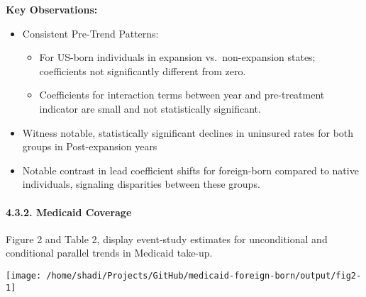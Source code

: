 \documentclass[
]{article}
\providecommand{\tightlist}{%
  \setlength{\itemsep}{0pt}\setlength{\parskip}{0pt}}
\begin{document}
\textbf{Key Observations:}

\begin{itemize}
\item
  Consistent Pre-Trend Patterns:

  \begin{itemize}
  \tightlist
  \item
    For US-born individuals in expansion vs.~non-expansion states;
    coefficients not significantly different from zero.
  \item
    Coefficients for interaction terms between year and pre-treatment
    indicator are small and not statistically significant.
  \end{itemize}
\item
  Witness notable, statistically significant declines in uninsured rates
  for both groups in Post-expansion years
\item
  Notable contrast in lead coefficient shifts for foreign-born compared
  to native individuals, signaling disparities between these groups.
\end{itemize}

\hypertarget{medicaid-coverage}{%
\paragraph{4.3.2. Medicaid Coverage}\label{medicaid-coverage}}

Figure 2 and Table 2, display event-study estimates for unconditional
and conditional parallel trends in Medicaid take-up.

\begin{center}\texttt{[image: /home/shadi/Projects/GitHub/medicaid-foreign-born/output/fig2-1]} \end{center}
\end{document}
